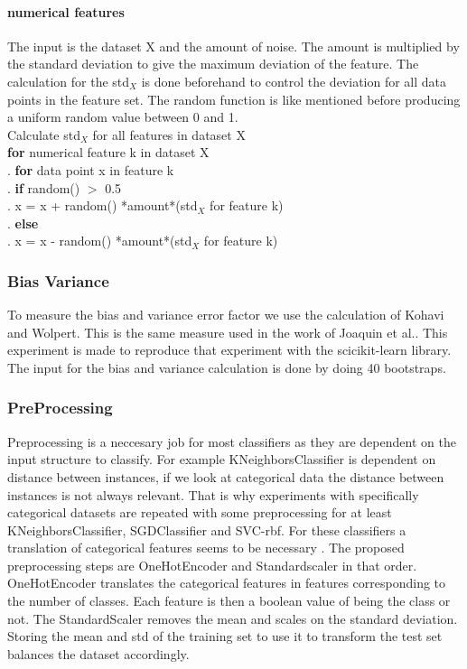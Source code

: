 \documentclass[a4paper,10pt]{article}
\begin{document}
\paragraph{numerical features \newline}
The input is the dataset X and the amount of noise. The amount is multiplied by the standard deviation to give the maximum deviation of the feature. The calculation for the std$_X$ is done beforehand to control the deviation for all data points in the feature set. The random function is like mentioned before producing a uniform random value between 0 and 1.\\
Calculate std$_X$ for all features in dataset X\\
\textbf{for} numerical feature k in dataset X\\
.\hspace{1cm} \textbf{for} data point x in feature k\\
.\hspace{2cm} \textbf{if} random() $>$ 0.5 \\	
.\hspace{3cm} x = x + random() *amount*(std$_X$ for feature k)\\
.\hspace{2cm} \textbf{else}  \\	
.\hspace{3cm} x = x - random() *amount*(std$_X$ for feature k) 
\\

\subsubsection{Bias Variance}
To measure the bias and variance error factor we use the calculation of Kohavi and Wolpert\cite{BiasCalc}. This is the same measure used in the work of Joaquin et al.\cite{Bias-var}. This experiment is made to reproduce that experiment with the scicikit-learn library. The input for the bias and variance calculation is done by doing 40 bootstraps. 

\subsubsection{PreProcessing}
Preprocessing is a neccesary job for most classifiers as they are dependent on the input structure to classify. For example KNeighborsClassifier is dependent on distance between instances, if we look at categorical data the distance between instances is not always relevant. That is why experiments with specifically categorical datasets are repeated with some preprocessing for at least KNeighborsClassifier, SGDClassifier and SVC-rbf. For these classifiers a translation of categorical features seems to be necessary \cite{KNN-Sym}\cite{SVM-sym}. The proposed preprocessing steps are OneHotEncoder and Standardscaler in that order. OneHotEncoder translates the categorical features in features corresponding to the number of classes. Each feature is then a boolean value of being the class or not. The StandardScaler removes the mean and scales on the standard deviation. Storing the mean and std of the training set to use it to transform the test set balances the dataset accordingly. 
\newpage
\end{document}
